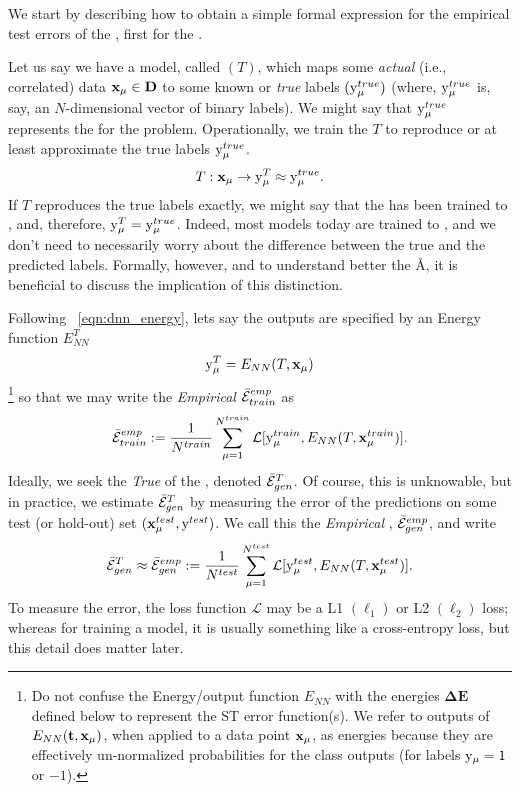 We start by describing how to obtain a simple formal expression for the empirical test errors of the \Teacher, first for the \TrueAccuracy.

Let us say we have a model, called \Teacher $(T)$, which maps some \emph{actual} (i.e., correlated) data
$\mathbf{x}_{\mu}\in\mathbf{D}$ to some known or \emph{true}  labels $(\mathrm{y}_{\mu}^{true})$
(where,  $\mathrm{y}_{\mu}^{true}$ is, say, an $N$-dimensional vector of binary labels).
We might say that $\mathrm{y}_{\mu}^{true}$ represents the \emph{\GroundTruth} for the problem.
Operationally, we train the \Teacher $T$ to reproduce or at least approximate the true labels $\mathrm{y}_{\mu}^{true}$.
\begin{align}
 T:\mathbf{x}_{\mu}\rightarrow \mathrm{y}_{\mu}^{T} \approx \mathrm{y}_{\mu}^{true}.
\end{align}
If $T$ reproduces the true labels exactly, we might say that the \Teacher has been
trained to \emph{\Interpolation}, and, therefore, $\mathrm{y}_{\mu}^{T} = \mathrm{y}_{\mu}^{true}$.
Indeed, most models today are trained to \emph{\Interpolation}, and we don't need to
necessarily worry about the difference between the true and the predicted \Teacher labels.
Formally, however, and to understand better the \AA, it is beneficial to discuss the implication
of this distinction.

Following \EQN~\ref{eqn:dnn_energy}, lets say the \Teacher outputs are specified
by an  Energy function $E^{T}_{NN}$
\begin{align}
\label{eqn:T_ENN}
\mathrm{y}_{\mu}^{T}=E_{NN}(T,\mathbf{x}_{\mu}) 
\end{align}
\footnote{Do not confuse the Energy/output function $E_{NN}$ with the energies $\mathbf{\Delta E}$  defined below to represent the ST error function(s).  We refer to outputs of $E_{NN}({\mathbf{t}},\mathbf{x}_{\mu} )$, when applied to a data point $\mathbf{x}_{\mu}$, as energies because they are effectively un-normalized probabilities for the class outputs (for labels $\mathrm{y}_{\mu}=1$ or $-1$).  }
so that we may write the \emph{Empirical} \AverageTrainingError
$\bar{\mathcal{E}}^{emp}_{train}$
as 
\begin{align}
\label{eqn:Eg_train}
\bar{\mathcal{E}}^{emp}_{train}:= \frac{1}{N^{train}}\sum_{\mu=1}^{N^{train}}\mathcal{L}[\mathrm{y}_{\mu}^{train},E_{NN}(T,\mathbf{x}_{\mu}^{train})]  .
\end{align}
Ideally, we seek the \emph{True} \AverageGeneralizationError of the \Teacher, denoted  $\bar{\mathcal{E}}_{gen}^{T}$. 
Of course, this is unknowable, but in practice, we estimate $\bar{\mathcal{E}}_{gen}^{T}$ 
by measuring the error of the \Teacher predictions on some test (or hold-out) set $(\mathbf{x}_{\mu}^{test}, \mathrm{y}^{test})$.
We call this the \emph{Empirical \AverageGeneralizationError}, $\bar{\mathcal{E}}^{emp}_{gen}$, and write
\begin{align}
\label{eqn:Eg_test}
 \bar{\mathcal{E}}_{gen}^{T}\approx \bar{\mathcal{E}}^{emp}_{gen}:= \frac{1}{N^{test}}\sum_{\mu=1}^{N^{test}}\mathcal{L}[\mathrm{y}_{\mu}^{test},E_{NN}(T,\mathbf{x}_{\mu}^{test})] .
\end{align}
To measure the error, the loss function $\mathcal{L}$ may be a L1 $(\ell_1)$ or L2 $(\ell_2)$ loss;
whereas for training a model, it is usually something like a cross-entropy loss, but this detail does matter later.

